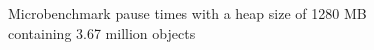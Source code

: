 \begin{figure}[t]
\begin{center}
\caption{Microbenchmark pause times with a heap size of 1280 MB containing
3.67 million objects\label{fig:microbench}}
\end{center}
\end{figure}
